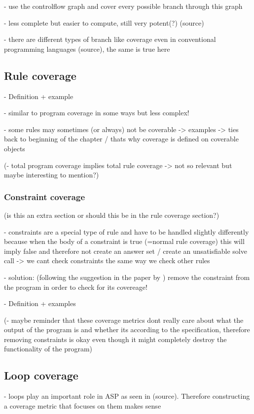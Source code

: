     - use the controlflow graph and cover every possible branch through this graph

- less complete but easier to compute, still very potent(?) (source)

- there are different types of branch like coverage even in conventional programming languages (source), the same is true here

\subsection{Rule coverage}
\label{subsec:Coverage metrics/Branch-like coverage/Rule coverage}
- Definition + example

- similar to program coverage in some ways but less complex!

- some rules may sometimes (or always) not be coverable -> examples -> ties back to beginning of the chapter / thats why coverage 
is defined on coverable objects

(- total program coverage implies total rule coverage -> not so relevant but maybe interesting to mention?)

\subsubsection{Constraint coverage}
\label{subsubsec:Coverage metrics/Branch-like coverage/Rule coverage/Constraint coverage}
(is this an extra section or should this be in the rule coverage section?)

- constraints are a special type of rule and have to be handled slightly differently because when the body of a constraint is true 
(=normal rule coverage) this will imply false and therefore not create an answer set / create an unsatisfiable solve call -> we 
cant check constraints the same way we check other rules

- solution: (following the suggestion in the paper by \textcite{Jan+11}) remove the constraint from the program in order to check 
for its covereage!

- Definition + examples

(- maybe reminder that these coverage metrics dont really care about what the output of the program is and whether its according to 
the specification, therefore removing constraints is okay even though it might completely destroy the functionality of the program)

\subsection{Loop coverage}
\label{subsec:Coverage metrics/Branch-like coverage/Loop coverage}
- loops play an important role in ASP as seen in (source). Therefore constructing a coverage metric that focuses on them makes sense

